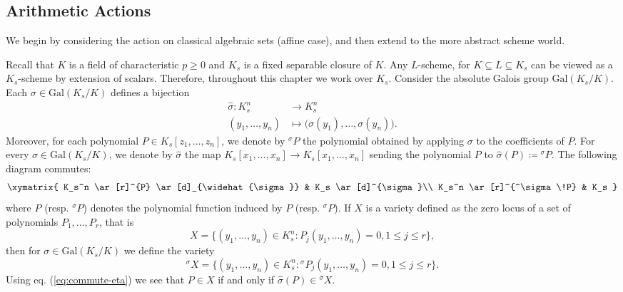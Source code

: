 \documentclass[10pt]{amsart}
\theoremstyle{definition}
\newcommand{\Gal}{{ \mathrm{Gal}}}
\begin{document}
\subsection{Arithmetic Actions}\label{subsec:aractions}

We begin by considering the action on classical algebraic sets (affine case), and  then extend to the more abstract scheme world. 

Recall that $K$ is a field of characteristic $p \geq 0$ and  $K_s$ is a fixed separable closure of $K$. Any $L$-scheme, for $K \subseteq L \subseteq K_s$ can be viewed as a $K_s$-scheme by extension of scalars. Therefore, throughout this chapter we work over $K_s$. Consider the absolute Galois group $\Gal(K_s/K)$.  Each $\sigma \in \Gal(K_s/K)$ defines a bijection 
\begin{align*}
  \widehat{\sigma} \colon K_s^n &\longrightarrow K_s^n \\
    (y_1,\ldots,y_n) & \longmapsto \big( \sigma(y_1),\ldots, \sigma(y_n) \big).
\end{align*}
Moreover, for each polynomial $P\in K_s[z_1,\ldots,z_n]$, we denote by ${^\sigma \!}{P}$ the polynomial obtained by applying $\sigma$ to the coefficients of $P$. 
For every $\sigma \in \Gal(K_s/K)$, we denote by $\hat{\sigma }$ the map $K_s[x_1, \ldots , x_n] \rightarrow K_s[x_1, \ldots , x_n]$ sending the polynomial $P$ to $\hat{\sigma }(P) \coloneqq {^\sigma \! P}$.
The following diagram commutes:
\begin{equation}
\label{eq:commute-eta}
  \xymatrix{
  K_s^n  \ar[r]^{P} \ar[d]_{\widehat{\sigma}} & K_s \ar[d]^{\sigma}\\
  K_s^n \ar[r]^{^\sigma\!P} & K_s
  }
\end{equation}
where $P$ (resp. $^{\sigma}\!P$) denotes the polynomial function induced by $P$ (resp. $^{\sigma}\!P$).
If $X$ is a variety defined as the zero locus of a set of polynomials $P_1,\ldots,P_r$, that is 
\[
  X=\{(y_1,\ldots,y_n) \in K_s^n: P_j(y_1,\ldots,y_n)=0, 1 \leq j \leq r\}, 
\]
then for $\sigma \in \Gal (K_s / K)$ we define the variety
\[
  {^\sigma \! X} =
  \{(y_1,\ldots,y_n) \in K_s^n: {^\sigma \!P}_j(y_1,\ldots,y_n)=0, 1 \leq j \leq r\}.
\]
Using eq. (\ref{eq:commute-eta}) we see that $P \in X $ if and only if $\widehat{\sigma}(P) \in {^\sigma \!X}$.
\end{document}
